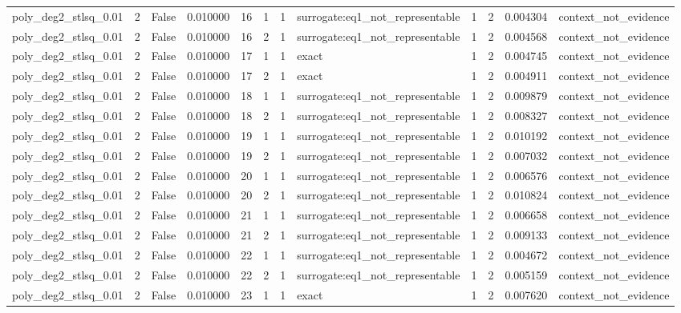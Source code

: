 \begin{tabular}{lrrrrrrlrrrl}
poly\_deg2\_stlsq\_0.01 & 2 & False & 0.010000 & 16 & 1 & 1 & surrogate:eq1\_not\_representable & 1 & 2 & 0.004304 & context\_not\_evidence \\
poly\_deg2\_stlsq\_0.01 & 2 & False & 0.010000 & 16 & 2 & 1 & surrogate:eq1\_not\_representable & 1 & 2 & 0.004568 & context\_not\_evidence \\
poly\_deg2\_stlsq\_0.01 & 2 & False & 0.010000 & 17 & 1 & 1 & exact & 1 & 2 & 0.004745 & context\_not\_evidence \\
poly\_deg2\_stlsq\_0.01 & 2 & False & 0.010000 & 17 & 2 & 1 & exact & 1 & 2 & 0.004911 & context\_not\_evidence \\
poly\_deg2\_stlsq\_0.01 & 2 & False & 0.010000 & 18 & 1 & 1 & surrogate:eq1\_not\_representable & 1 & 2 & 0.009879 & context\_not\_evidence \\
poly\_deg2\_stlsq\_0.01 & 2 & False & 0.010000 & 18 & 2 & 1 & surrogate:eq1\_not\_representable & 1 & 2 & 0.008327 & context\_not\_evidence \\
poly\_deg2\_stlsq\_0.01 & 2 & False & 0.010000 & 19 & 1 & 1 & surrogate:eq1\_not\_representable & 1 & 2 & 0.010192 & context\_not\_evidence \\
poly\_deg2\_stlsq\_0.01 & 2 & False & 0.010000 & 19 & 2 & 1 & surrogate:eq1\_not\_representable & 1 & 2 & 0.007032 & context\_not\_evidence \\
poly\_deg2\_stlsq\_0.01 & 2 & False & 0.010000 & 20 & 1 & 1 & surrogate:eq1\_not\_representable & 1 & 2 & 0.006576 & context\_not\_evidence \\
poly\_deg2\_stlsq\_0.01 & 2 & False & 0.010000 & 20 & 2 & 1 & surrogate:eq1\_not\_representable & 1 & 2 & 0.010824 & context\_not\_evidence \\
poly\_deg2\_stlsq\_0.01 & 2 & False & 0.010000 & 21 & 1 & 1 & surrogate:eq1\_not\_representable & 1 & 2 & 0.006658 & context\_not\_evidence \\
poly\_deg2\_stlsq\_0.01 & 2 & False & 0.010000 & 21 & 2 & 1 & surrogate:eq1\_not\_representable & 1 & 2 & 0.009133 & context\_not\_evidence \\
poly\_deg2\_stlsq\_0.01 & 2 & False & 0.010000 & 22 & 1 & 1 & surrogate:eq1\_not\_representable & 1 & 2 & 0.004672 & context\_not\_evidence \\
poly\_deg2\_stlsq\_0.01 & 2 & False & 0.010000 & 22 & 2 & 1 & surrogate:eq1\_not\_representable & 1 & 2 & 0.005159 & context\_not\_evidence \\
poly\_deg2\_stlsq\_0.01 & 2 & False & 0.010000 & 23 & 1 & 1 & exact & 1 & 2 & 0.007620 & context\_not\_evidence \\

\end{tabular}
